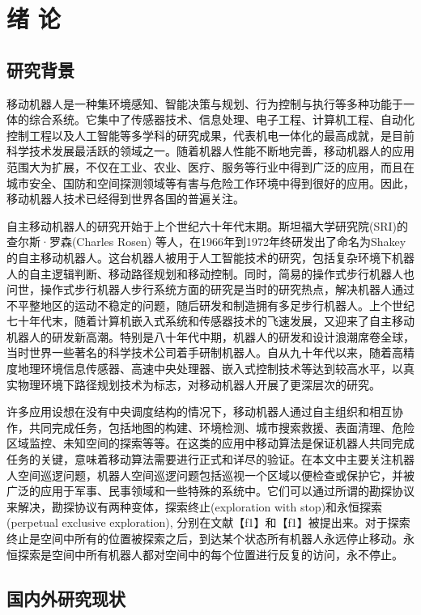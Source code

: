 \chapter{绪\hskip 0.4cm 论}


\section{研究背景}
移动机器人是一种集环境感知、智能决策与规划、行为控制与执行等多种功能于一体的综合系统。它集中了传感器技术、信息处理、电子工程、计算机工程、自动化控制工程以及人工智能等多学科的研究成果，代表机电一体化的最高成就，是目前科学技术发展最活跃的领域之一。随着机器人性能不断地完善，移动机器人的应用范围大为扩展，不仅在工业、农业、医疗、服务等行业中得到广泛的应用，而且在城市安全、国防和空间探测领域等有害与危险工作环境中得到很好的应用。因此，移动机器人技术已经得到世界各国的普遍关注。

自主移动机器人的研究开始于上个世纪六十年代末期。斯坦福大学研究院(SRI)的查尔斯·罗森(Charles Rosen) 等人，在1966年到1972年终研发出了命名为Shakey的自主移动机器人。这台机器人被用于人工智能技术的研究，包括复杂环境下机器人的自主逻辑判断、移动路径规划和移动控制。同时，简易的操作式步行机器人也问世，操作式步行机器人步行系统方面的研究是当时的研究热点，解决机器人通过不平整地区的运动不稳定的问题，随后研发和制造拥有多足步行机器人。上个世纪七十年代末，随着计算机嵌入式系统和传感器技术的飞速发展，又迎来了自主移动机器人的研发新高潮。特别是八十年代中期，机器人的研发和设计浪潮席卷全球，当时世界一些著名的科学技术公司着手研制机器人。自从九十年代以来，随着高精度地理环境信息传感器、高速中央处理器、嵌入式控制技术等达到较高水平，以真实物理环境下路径规划技术为标志，对移动机器人开展了更深层次的研究。

许多应用设想在没有中央调度结构的情况下，移动机器人通过自主组织和相互协作，共同完成任务，包括地图的构建、环境检测、城市搜索救援、表面清理、危险区域监控、未知空间的探索等等。在这类的应用中移动算法是保证机器人共同完成任务的关键，意味着移动算法需要进行正式和详尽的验证。在本文中主要关注机器人空间巡逻问题，机器人空间巡逻问题包括巡视一个区域以便检查或保护它，并被广泛的应用于军事、民事领域和一些特殊的系统中。它们可以通过所谓的勘探协议来解决，勘探协议有两种变体，探索终止(exploration with stop)和永恒探索(perpetual exclusive exploration), 分别在文献【f1】和【f1】被提出来。对于探索终止是空间中所有的位置被探索之后，到达某个状态所有机器人永远停止移动。永恒探索是空间中所有机器人都对空间中的每个位置进行反复的访问，永不停止。




\section{国内外研究现状}


